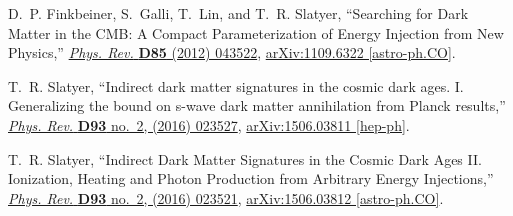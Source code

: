 \documentclass[aps,prd,letterpaper,showpacs,twocolumn,preprintnumbers,floatfix,superscriptaddress]{revtex4-1}
\begin{document}
\begin{thebibliography}{99}
D.~P. Finkbeiner, S.~Galli, T.~Lin, and T.~R. Slatyer, ``{Searching for Dark
  Matter in the CMB: A Compact Parameterization of Energy Injection from New
  Physics},'' \href{http://dx.doi.org/10.1103/PhysRevD.85.043522}{{\em Phys.
  Rev.} {\bfseries D85} (2012) 043522},
\href{http://arxiv.org/abs/1109.6322}{{\ttfamily arXiv:1109.6322
  [astro-ph.CO]}}.

T.~R. Slatyer, ``{Indirect dark matter signatures in the cosmic dark ages. I.
  Generalizing the bound on s-wave dark matter annihilation from Planck
  results},'' \href{http://dx.doi.org/10.1103/PhysRevD.93.023527}{{\em Phys.
  Rev.} {\bfseries D93} no.~2, (2016) 023527},
\href{http://arxiv.org/abs/1506.03811}{{\ttfamily arXiv:1506.03811 [hep-ph]}}.

T.~R. Slatyer, ``{Indirect Dark Matter Signatures in the Cosmic Dark Ages II.
  Ionization, Heating and Photon Production from Arbitrary Energy
  Injections},'' \href{http://dx.doi.org/10.1103/PhysRevD.93.023521}{{\em Phys.
  Rev.} {\bfseries D93} no.~2, (2016) 023521},
\href{http://arxiv.org/abs/1506.03812}{{\ttfamily arXiv:1506.03812
  [astro-ph.CO]}}.


\end{thebibliography}
\end{document}

